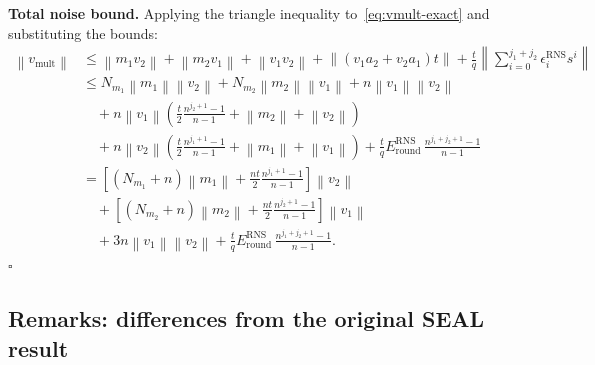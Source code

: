 \documentclass[11pt]{article}
\newcommand{\norm}[1]{\left\lVert #1\right\rVert}
\newcommand{\vmult}{v_{\mathrm{mult}}}
\newcommand{\Sgeo}[1]{\frac{n^{#1+1}-1}{n-1}}            %
\theoremstyle{plain}
\theoremstyle{definition}
\theoremstyle{remark}
\begin{document}
\textbf{Total noise bound.}
Applying the triangle inequality to~\eqref{eq:vmult-exact} and substituting the bounds:
\begin{align*}
\norm{\vmult}
&\leq \norm{m_1v_2} + \norm{m_2v_1} + \norm{v_1v_2} + \norm{(v_1a_2+v_2a_1)t}
      + \frac{t}{q}\left\lVert\sum_{i=0}^{j_1+j_2}\epsilon_i^{\mathrm{RNS}}s^i\right\rVert\\
&\leq N_{m_1}\norm{m_1}\norm{v_2} + N_{m_2}\norm{m_2}\norm{v_1} + n\norm{v_1}\norm{v_2}\\
&\quad + n\norm{v_1}\left(\frac{t}{2}\Sgeo{j_2} + \norm{m_2} + \norm{v_2}\right)\\
&\quad + n\norm{v_2}\left(\frac{t}{2}\Sgeo{j_1} + \norm{m_1} + \norm{v_1}\right)
      + \frac{t}{q}E_{\mathrm{round}}^{\mathrm{RNS}}\,\Sgeo{j_1+j_2}\\
&= \left[(N_{m_1}+n)\norm{m_1} + \frac{nt}{2}\Sgeo{j_1}\right]\norm{v_2}\\
&\quad + \left[(N_{m_2}+n)\norm{m_2} + \frac{nt}{2}\Sgeo{j_2}\right]\norm{v_1}\\
&\quad + 3n\norm{v_1}\norm{v_2} + \frac{t}{q}E_{\mathrm{round}}^{\mathrm{RNS}}\,\Sgeo{j_1+j_2}.
\end{align*}
\hfill$\square$

\subsection{Remarks: differences from the original SEAL result}
\end{document}
